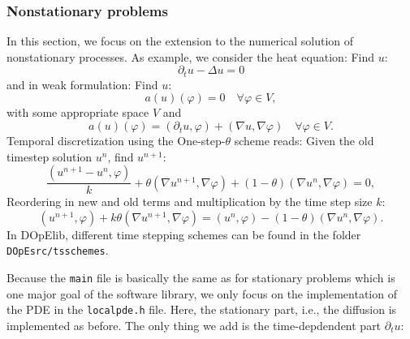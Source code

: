 \documentclass[prodmode,acmtoms]{acmsmall}
\numberwithin{equation}{section}
\renewcommand{\phi}{\varphi}
\begin{document}
\subsubsection{Nonstationary problems}
In this section, we focus on the extension to 
the numerical solution of nonstationary processes. 
As example, we consider the heat equation:
Find $u$:
\[
\partial_t u - \Delta u = 0
\]
and in weak formulation:
Find $u$:
\[
a(u)(\phi) = 0 \quad \forall \phi \in V,
\]
with some appropriate space $V$ and 
\[
a(u)(\phi) = (\partial_t u, \phi) + (\nabla u, \nabla \phi) \quad \forall \phi \in V.
\]
Temporal discretization using the One-step-$\theta$ scheme reads:
Given the old timestep solution $u^n$, find $u^{n+1}$:
\[
\frac{(u^{n+1} - u^{n}, \phi)}{k} + \theta (\nabla u^{n+1}, \nabla \phi)
+ (1 - \theta) (\nabla u^{n}, \nabla \phi) = 0,
\]
Reordering in new and old terms and multiplication by the time step size $k$:
\[
(u^{n+1},\phi) + k \theta (\nabla u^{n+1}, \nabla \phi)
= (u^n, \phi) - (1 - \theta) (\nabla u^{n}, \nabla \phi).
\]
In DOpElib, different time stepping schemes can be found 
in the folder \texttt{DOpEsrc/tsschemes}.

Because the \texttt{main} file 
is basically the same as for stationary problems
which is one major goal of the software library,
we only focus on the implementation of the PDE in the 
\texttt{localpde.h} file. Here, the stationary part, i.e.,
the diffusion is implemented as before. The only thing we add 
is the time-depdendent part $\partial_t u$:
\end{document}
